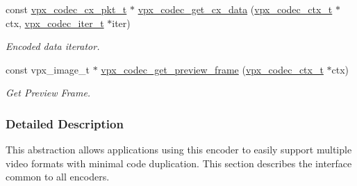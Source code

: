 \begin{DoxyCompactItemize}
const \hyperlink{group__encoder_ga3f711e17fbefac545e8959ef5a023556}{vpx\-\_\-codec\-\_\-cx\-\_\-pkt\-\_\-t} $\ast$ \hyperlink{group__encoder_gae81cab25d66cf3bc59f1f75f8a5af720}{vpx\-\_\-codec\-\_\-get\-\_\-cx\-\_\-data} (\hyperlink{group__codec_gad03e2dfa6ae511db7d25be6bbb336233}{vpx\-\_\-codec\-\_\-ctx\-\_\-t} $\ast$ctx, \hyperlink{group__codec_ga6ea348f76b1f8a1fe50e14db684146c6}{vpx\-\_\-codec\-\_\-iter\-\_\-t} $\ast$iter)
\begin{DoxyCompactList}\small\item\em \-Encoded data iterator. \end{DoxyCompactList}\item 
const vpx\-\_\-image\-\_\-t $\ast$ \hyperlink{group__encoder_ga250aee4536aa2475e85cf61c9710c963}{vpx\-\_\-codec\-\_\-get\-\_\-preview\-\_\-frame} (\hyperlink{group__codec_gad03e2dfa6ae511db7d25be6bbb336233}{vpx\-\_\-codec\-\_\-ctx\-\_\-t} $\ast$ctx)
\begin{DoxyCompactList}\small\item\em \-Get \-Preview \-Frame. \end{DoxyCompactList}\end{DoxyCompactItemize}


\subsubsection{\-Detailed \-Description}
\-This abstraction allows applications using this encoder to easily support multiple video formats with minimal code duplication. \-This section describes the interface common to all encoders. 

